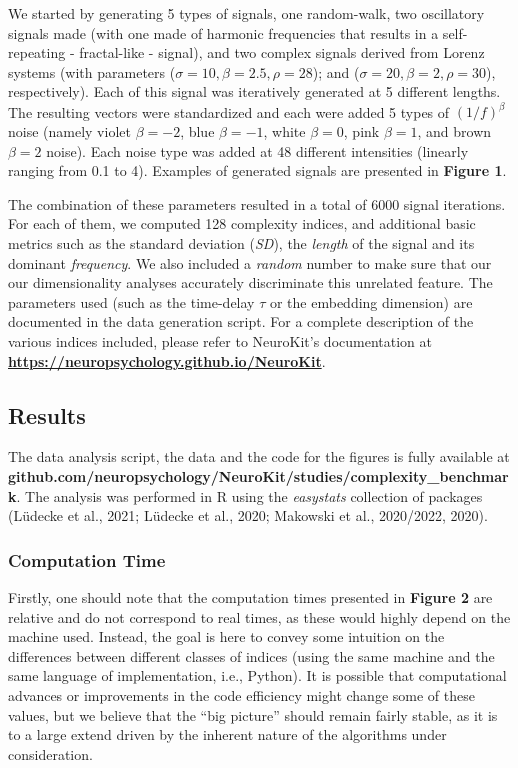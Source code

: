 \documentclass[
  man]{apa6}
\begin{document}
We started by generating 5 types of signals, one random-walk, two oscillatory signals made (with one made of harmonic frequencies that results in a self-repeating - fractal-like - signal), and two complex signals derived from Lorenz systems (with parameters (\(\sigma = 10, \beta = 2.5, \rho = 28\)); and (\(\sigma = 20, \beta = 2, \rho = 30\)), respectively). Each of this signal was iteratively generated at 5 different lengths. The resulting vectors were standardized and each were added 5 types of \((1/f)^\beta\) noise (namely violet \(\beta=-2\), blue \(\beta=-1\), white \(\beta=0\), pink \(\beta=1\), and brown \(\beta=2\) noise). Each noise type was added at 48 different intensities (linearly ranging from 0.1 to 4). Examples of generated signals are presented in \textbf{Figure 1}.

The combination of these parameters resulted in a total of 6000 signal iterations. For each of them, we computed 128 complexity indices, and additional basic metrics such as the standard deviation (\emph{SD}), the \emph{length} of the signal and its dominant \emph{frequency}. We also included a \emph{random} number to make sure that our our dimensionality analyses accurately discriminate this unrelated feature. The parameters used (such as the time-delay \(\tau\) or the embedding dimension) are documented in the data generation script. For a complete description of the various indices included, please refer to NeuroKit's documentation at \textbf{\url{https://neuropsychology.github.io/NeuroKit}}.

\hypertarget{results}{%
\subsection{Results}\label{results}}

The data analysis script, the data and the code for the figures is fully available at \textbf{github.com/neuropsychology/NeuroKit/studies/complexity\_benchmark}. The analysis was performed in R using the \emph{easystats} collection of packages (Lüdecke et al., 2021; Lüdecke et al., 2020; Makowski et al., 2020/2022, 2020).

\hypertarget{computation-time}{%
\subsubsection{Computation Time}\label{computation-time}}

Firstly, one should note that the computation times presented in \textbf{Figure 2} are relative and do not correspond to real times, as these would highly depend on the machine used. Instead, the goal is here to convey some intuition on the differences between different classes of indices (using the same machine and the same language of implementation, i.e., Python). It is possible that computational advances or improvements in the code efficiency might change some of these values, but we believe that the ``big picture'' should remain fairly stable, as it is to a large extend driven by the inherent nature of the algorithms under consideration.
\end{document}
